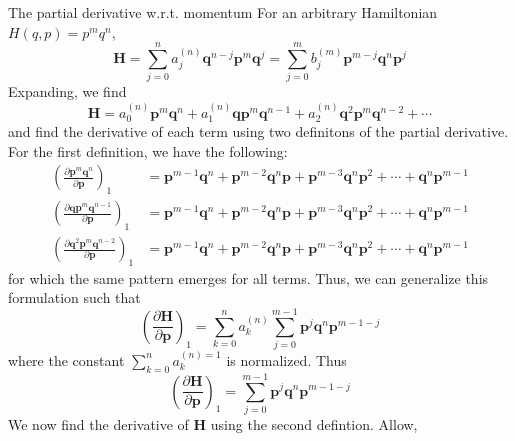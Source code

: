\documentclass[aspectratio=169]{beamer}
\begin{document}
	\begin{frame}[allowframebreaks]{The partial derivative w.r.t. momentum}
		For an arbitrary Hamiltonian $H(q,p)=p^mq^n$,
		\begin{equation}
			\textbf{H}=\sum_{j=0}^{n}a_j^{(n)}\textbf{q}^{n-j}\textbf{p}^m\textbf{q}^j=\sum_{j=0}^mb^{(m)}_j\textbf{p}^{m-j}\textbf{q}^n\textbf{p}^j
		\end{equation}
		Expanding, we find
		\begin{equation}
			\textbf{H}=a_0^{(n)}\textbf{p}^m\textbf{q}^n+a_1^{(n)}\textbf{q}\textbf{p}^m\textbf{q}^{n-1}+a_2^{(n)}\textbf{q}^2\textbf{p}^m\textbf{q}^{n-2}+\cdots
		\end{equation}
		and find the derivative of each term using two definitons of the partial derivative. For the first definition, we have the following:
		\begin{align}
			\left(\frac{\partial\textbf{p}^m\textbf{q}^n}{\partial\textbf{p}}\right)_1&=\textbf{p}^{m-1}\textbf{q}^n+\textbf{p}^{m-2}\textbf{q}^n\textbf{p}+\textbf{p}^{m-3}\textbf{q}^n\textbf{p}^{2}+\cdots+\textbf{q}^n\textbf{p}^{m-1} \\
			\left(\frac{\partial\textbf{q}\textbf{p}^m\textbf{q}^{n-1}}{\partial\textbf{p}}\right)_1&=\textbf{p}^{m-1}\textbf{q}^n+\textbf{p}^{m-2}\textbf{q}^n\textbf{p}+\textbf{p}^{m-3}\textbf{q}^n\textbf{p}^{2}+\cdots+\textbf{q}^n\textbf{p}^{m-1} \\
			\left(\frac{\partial\textbf{q}^2\textbf{p}^m\textbf{q}^{n-2}}{\partial\textbf{p}}\right)_1&=\textbf{p}^{m-1}\textbf{q}^n+\textbf{p}^{m-2}\textbf{q}^n\textbf{p}+\textbf{p}^{m-3}\textbf{q}^n\textbf{p}^{2}+\cdots+\textbf{q}^n\textbf{p}^{m-1}
		\end{align}
		for which the same pattern emerges for all terms. Thus, we can generalize this formulation such that
		\begin{equation}
			\left( \frac{\partial\textbf{H}}{\partial\textbf{p}}\right)_1=\sum_{k=0}^na_k^{(n)}\sum_{j=0}^{m-1}\textbf{p}^j\textbf{q}^n\textbf{p}^{m-1-j}
		\end{equation}
		where the constant $\sum_{k=0}^na_k^{(n)=1}$ is normalized. Thus
		\begin{equation}
			\left( \frac{\partial\textbf{H}}{\partial\textbf{p}}\right)_1=\sum_{j=0}^{m-1}\textbf{p}^j\textbf{q}^n\textbf{p}^{m-1-j}
		\end{equation}
		We now find the derivative of $\textbf{H}$ using the second defintion. Allow,
		\begin{gather}
			\begin{aligned}

\end{aligned}
\end{gather}
\end{frame}
\end{document}
